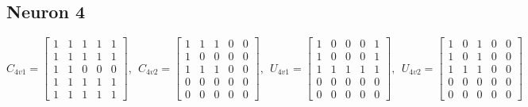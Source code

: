 \documentclass{article}
\begin{document}
	\subsection{Neuron 4}
	\[
	C_{4v1} = 
	\begin{bmatrix}
	1 & 1 & 1 & 1 & 1 \\
	1 & 1 & 1 & 1 & 1 \\
	1 & 1 & 0 & 0 & 0 \\
	1 & 1 & 1 & 1 & 1 \\
	1 & 1 & 1 & 1 & 1
	\end{bmatrix}
	,~~C_{4v2} = 
	\begin{bmatrix}
	1 & 1 & 1 & 0 & 0 \\
	1 & 0 & 0 & 0 & 0 \\
	1 & 1 & 1 & 0 & 0 \\
	0 & 0 & 0 & 0 & 0 \\
	0 & 0 & 0 & 0 & 0
	\end{bmatrix}
	,~~U_{4v1} = 
	\begin{bmatrix}
	1 & 0 & 0 & 0 & 1 \\
	1 & 0 & 0 & 0 & 1 \\
	1 & 1 & 1 & 1 & 1 \\
	0 & 0 & 0 & 0 & 0 \\
	0 & 0 & 0 & 0 & 0
	\end{bmatrix}
	,~~U_{4v2} = 
	\begin{bmatrix}
	1 & 0 & 1 & 0 & 0 \\
	1 & 0 & 1 & 0 & 0 \\
	1 & 1 & 1 & 0 & 0 \\
	0 & 0 & 0 & 0 & 0 \\
	0 & 0 & 0 & 0 & 0
	\end{bmatrix}
	\]
\end{document}
